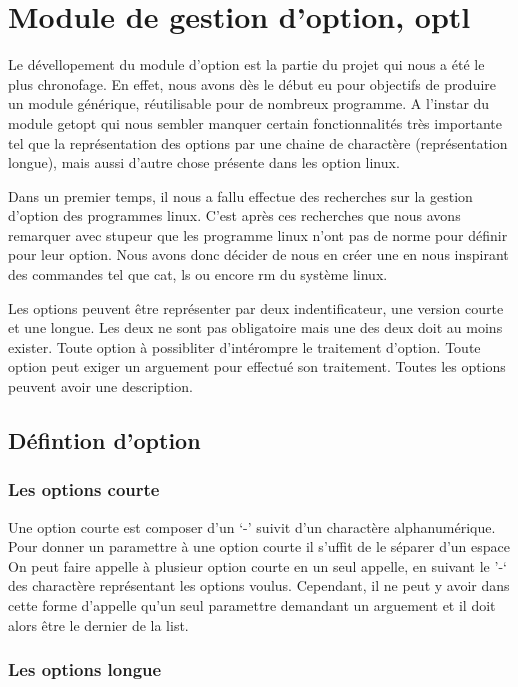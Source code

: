 \documentclass[12pt]{article}
\begin{document}
    \section{Module de gestion d'option, optl}
    Le dévellopement du module d'option est la partie du projet qui nous a été 
    le plus chronofage. En effet, nous avons dès le début eu pour objectifs de 
    produire un module générique, réutilisable pour de nombreux programme. A 
    l'instar du module getopt qui nous sembler manquer certain fonctionnalités
    très importante tel que la représentation des options par une chaine de 
    charactère (représentation longue), mais aussi d'autre chose présente dans 
    les option linux. 

    Dans un premier temps, il nous a fallu effectue des recherches sur la 
    gestion d'option des programmes linux. C'est après ces recherches que nous 
    avons remarquer avec stupeur que les programme linux n'ont pas de norme pour 
    définir pour leur option. Nous avons donc décider de nous en créer une en 
    nous inspirant des commandes tel que cat, ls ou encore rm du système linux.

    Les options peuvent être représenter par deux indentificateur, une version 
    courte et une longue. Les deux ne sont pas obligatoire mais une des deux 
    doit au moins exister. Toute option à possibliter d'intérompre le traitement 
    d'option. Toute option peut exiger un arguement pour effectué son 
    traitement. Toutes les options peuvent avoir une description. 

    \subsection{Défintion d'option}

    \subsubsection{Les options courte}

    Une option courte est composer d'un `-' suivit d'un charactère 
    alphanumérique. Pour donner un paramettre à une option courte il s'uffit de 
    le séparer d'un espace On peut faire appelle à plusieur option courte en un 
    seul  appelle, en suivant le '-` des charactère représentant les options 
    voulus. Cependant, il ne peut y avoir dans cette forme d'appelle qu'un seul 
    paramettre demandant un arguement et il doit alors être le dernier de la 
    list. 

    \subsubsection{Les options longue}
\end{document}
